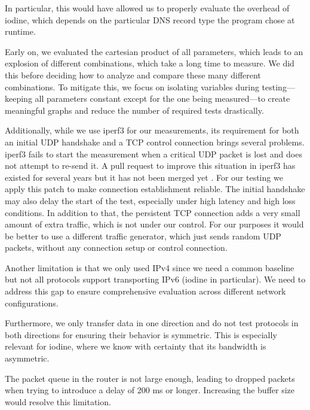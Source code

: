 In particular, this would have allowed us to properly evaluate the overhead of iodine, which depends on the particular DNS record type the program chose at runtime.

Early on, we evaluated the cartesian product of all parameters, which leads to an explosion of different combinations, which take a long time to measure.
We did this before deciding how to analyze and compare these many different combinations.
To mitigate this, we focus on isolating variables during testing—keeping all parameters constant except for the one being measured—to create meaningful graphs and reduce the number of required tests drastically.

Additionally, while we use iperf3 for our measurements, its requirement for both an initial UDP handshake and a TCP control connection brings several problems.
iperf3 fails to start the measurement when a critical UDP packet is lost and does not attempt to re-send it.
A pull request to improve this situation in iperf3 has existed for several years but it has not been merged yet \cite{iperf-udp-connect-retry}.
For our testing we apply this patch to make connection establishment reliable.
The initial handshake may also delay the start of the test, especially under high latency and high loss conditions.
In addition to that, the persistent TCP connection adds a very small amount of extra traffic, which is not under our control.
For our purposes it would be better to use a different traffic generator, which just sends random UDP packets, without any connection setup or control connection.

Another limitation is that we only used IPv4 since we need a common baseline but not all protocols support transporting IPv6 (iodine in particular).
We need to address this gap to ensure comprehensive evaluation across different network configurations.

Furthermore, we only transfer data in one direction and do not test protocols in both directions for ensuring their behavior is symmetric.
This is especially relevant for iodine, where we know with certainty that its bandwidth is asymmetric.

The packet queue in the router is not large enough, leading to dropped packets when trying to introduce a delay of 200 ms or longer.
Increasing the buffer size would resolve this limitation.

